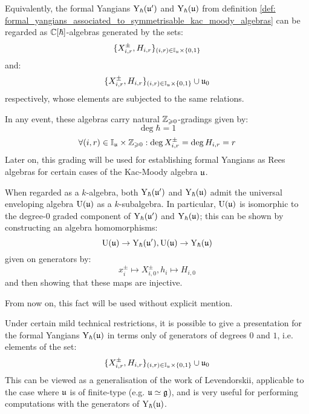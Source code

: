         \begin{remark} \label{remark: positive_Z_grading_on_formal_yangians}
            Equivalently, the formal Yangians $\mathrm{Y}_{\hbar}(\mathfrak{u}')$ and $\mathrm{Y}_{\hbar}(\mathfrak{u})$ from definition \ref{def: formal_yangians_associated_to_symmetrisable_kac_moody_algebras} can be regarded as $\mathbb{C}[\hbar]$-algebras generated by the sets:
                $$\{X_{i, r}^{\pm}, H_{i, r}\}_{(i, r) \in \simpleroots_{\fraku} \x \{0, 1\}}$$
            and:
                $$\{X_{i, r}^{\pm}, H_{i, r}\}_{(i, r) \in \simpleroots_{\fraku} \x \{0, 1\}} \cup \fraku_0$$
            respectively, whose elements are subjected to the same relations.

            In any event, these algebras carry natural $\mathbb{Z}_{\geqslant 0}$-gradings given by:
                $$\deg \hbar = 1$$
                $$\forall (i, r) \in \simpleroots_{\fraku} \x \Z_{\geq 0}: \deg X^{\pm}_{i, r} = \deg H_{i, r} = r$$
            Later on, this grading will be used for establishing formal Yangians as Rees algebras for certain cases of the Kac-Moody algebra $\mathfrak{u}$.
        \end{remark}
        \begin{remark} \label{remark: universal_enveloping_algebras_inside_yangians}
            When regarded as a $k$-algebra, both $\mathrm{Y}_{\hbar}(\mathfrak{u}')$ and $\mathrm{Y}_{\hbar}(\mathfrak{u})$ admit the universal enveloping algebra $\mathrm{U}(\mathfrak{u})$ as a $k$-subalgebra. In particular, $\mathrm{U}(\mathfrak{u})$ is isomorphic to the degree-$0$ graded component of $\mathrm{Y}_{\hbar}(\mathfrak{u}')$ and $\mathrm{Y}_{\hbar}(\mathfrak{u})$; this can be shown by constructing an algebra homomorphisms:
                $$\mathrm{U}(\mathfrak{u}) \to \mathrm{Y}_{\hbar}(\mathfrak{u}'), \mathrm{U}(\mathfrak{u}) \to \mathrm{Y}_{\hbar}(\mathfrak{u})$$
            given on generators by:
                $$x_i^{\pm} \mapsto X_{i, 0}^{\pm}, h_i \mapsto H_{i, 0}$$
            and then showing that these maps are injective. 

            From now on, this fact will be used without explicit mention.
        \end{remark}

        Under certain mild technical restrictions, it is possible to give a presentation for the formal Yangians $\mathrm{Y}_{\hbar}(\mathfrak{u})$ in terms only of generators of degrees $0$ and $1$, i.e. elements of the set:
            $$\{X_{i, r}^{\pm}, H_{i, r}\}_{(i, r) \in \simpleroots_{\fraku} \x \{0, 1\}} \cup \fraku_0$$
        This can be viewed as a generalisation of the work \cite{levendorskii_finite_type_yangians_presentation} of Levendorskii, applicable to the case where $\mathfrak{u}$ is of finite-type (e.g. $\mathfrak{u} \simeq \mathfrak{g}$), and is very useful for performing computations with the generators of $\mathrm{Y}_{\hbar}(\mathfrak{u})$.
        
